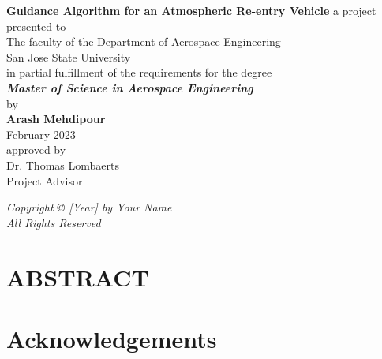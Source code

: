 \documentclass[12pt]{article}
\numberwithin{equation}{section}
\numberwithin{figure}{section}
\numberwithin{table}{section}
\begin{document}
\setcounter{page}{1}
\begin{titlepage}
    \centering
    \vspace*{3cm}
    {\fontsize{28}{32}\selectfont \textbf{Guidance Algorithm for an Atmospheric Re-entry Vehicle}}
    \vfill
    a project presented to \\
    The faculty of the Department of Aerospace Engineering\\
    San Jose State University\\
    \vfill
    in partial fulfillment of the requirements for the degree\\
    {\fontsize{14}{16}\selectfont \emph{\textbf{Master of Science in Aerospace Engineering}}}\\
    \vfill
    by\\
    {\fontsize{18}{20}\selectfont \textbf{Arash Mehdipour}}\\
    February 2023\\
    \vfill
    {\fontsize{10}{12} \selectfont approved by}\\
    Dr. Thomas Lombaerts\\
    {\fontsize{10}{12} \selectfont Project Advisor}

\end{titlepage}

\newpage
\thispagestyle{empty}
\mbox{}
\vfill
\begin{center}
\emph{Copyright © [Year] by Your Name\\[0.2cm]
All Rights Reserved}
\end{center}
\newpage

\setcounter{page}{3}
\section*{\centering ABSTRACT}


\newpage

\section*{Acknowledgements}


\newpage

\tableofcontents

\newpage

\listoffigures

\newpage

\end{document}
